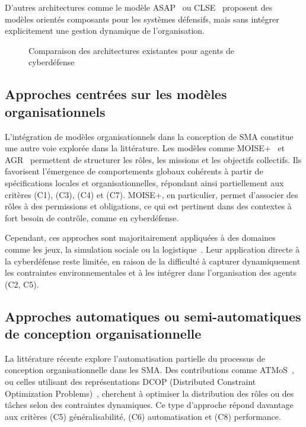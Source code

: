 \documentclass[ twoside,openright,titlepage,numbers=noenddot,headinclude,%
                footinclude=true,cleardoublepage=empty,abstractoff, %
                BCOR=5mm,paper=a4,fontsize=11pt,%
                french,american,%
                ]{scrreprt}
\begin{document}
D'autres architectures comme le modèle ASAP~\cite{asap2017} ou CLSE~\cite{clse2016} proposent des modèles orientés composants pour les systèmes défensifs, mais sans intégrer explicitement une gestion dynamique de l'organisation.

\begin{figure}[h]
    \centering
    \caption{Comparaison des architectures existantes pour agents de cyberdéfense}
    \label{fig:architectures-aica}
\end{figure}

\subsection*{Approches centrées sur les modèles organisationnels}

L'intégration de modèles organisationnels dans la conception de SMA constitue une autre voie explorée dans la littérature. Les modèles comme MOISE+~\cite{hubner2002moise} et AGR~\cite{ferber2003agr} permettent de structurer les rôles, les missions et les objectifs collectifs. Ils favorisent l'émergence de comportements globaux cohérents à partir de spécifications locales et organisationnelles, répondant ainsi partiellement aux critères (C1), (C3), (C4) et (C7). MOISE+, en particulier, permet d'associer des rôles à des permissions et obligations, ce qui est pertinent dans des contextes à fort besoin de contrôle, comme en cyberdéfense.

Cependant, ces approches sont majoritairement appliquées à des domaines comme les jeux, la simulation sociale ou la logistique~\cite{ricordel2000analysis}. Leur application directe à la cyberdéfense reste limitée, en raison de la difficulté à capturer dynamiquement les contraintes environnementales et à les intégrer dans l'organisation des agents (C2, C5).

\subsection*{Approches automatiques ou semi-automatiques de conception organisationnelle}

La littérature récente explore l'automatisation partielle du processus de conception organisationnelle dans les SMA. Des contributions comme ATMoS~\cite{atmos2019}, ou celles utilisant des représentations DCOP (Distributed Constraint Optimization Problems)~\cite{modi2005adopt}, cherchent à optimiser la distribution des rôles ou des tâches selon des contraintes dynamiques. Ce type d'approche répond davantage aux critères (C5) généralisabilité, (C6) automatisation et (C8) performance.
\end{document}
